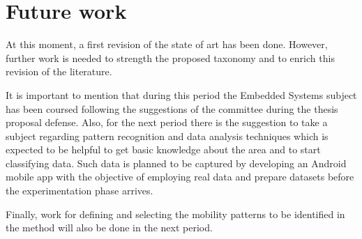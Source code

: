 \section{Future work}
\label{sec:future_work}
At this moment, a first revision of the state of art has been done.
However, further work is needed to strength the proposed taxonomy and to enrich this revision of the literature.

It is important to mention that during this period the Embedded Systems subject has been coursed following the suggestions of the committee during the thesis proposal defense. Also, for the next period there is the suggestion to take a subject regarding pattern recognition and data analysis techniques which is expected to be helpful to get basic knowledge about the area and to start classifying data. Such data is planned to be captured by developing an Android mobile app with the objective of employing real data and prepare datasets before the experimentation phase arrives.

Finally, work for defining and selecting the mobility patterns to be identified in the method will also be done in the next period.